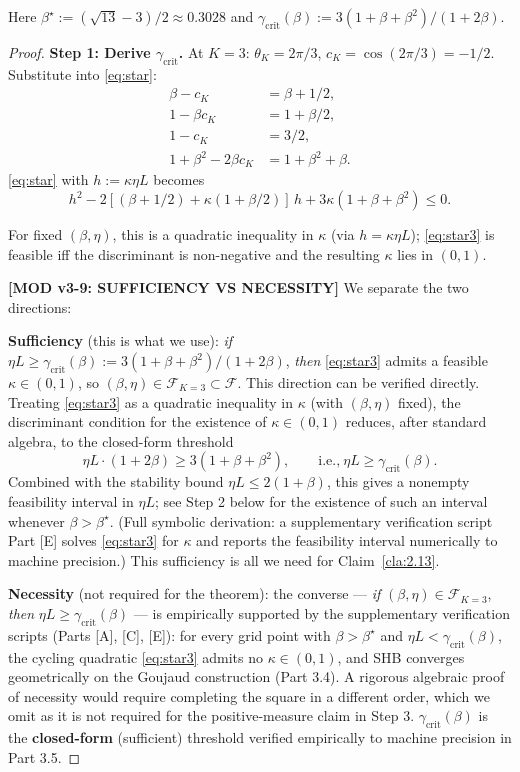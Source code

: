 \documentclass[11pt,a4paper]{article}
\theoremstyle{plain}
\theoremstyle{definition}
\theoremstyle{remark}
\newcommand{\F}{\mathcal{F}}
\begin{document}
Here $\beta^\star := (\sqrt{13} - 3)/2 \approx 0.3028$ and $\gamma_\mathrm{crit}(\beta) := 3(1+\beta+\beta^2)/(1 + 2\beta)$.

\begin{proof}
\textbf{Step 1: Derive $\gamma_\mathrm{crit}$.} At $K = 3$: $\theta_K = 2\pi/3$, $c_K = \cos(2\pi/3) = -1/2$. Substitute into \eqref{eq:star}:
\begin{align*}
\beta - c_K &= \beta + 1/2,\\
1 - \beta c_K &= 1 + \beta/2,\\
1 - c_K &= 3/2,\\
1 + \beta^2 - 2\beta c_K &= 1 + \beta^2 + \beta.
\end{align*}
\eqref{eq:star} with $h := \kappa \eta L$ becomes
\begin{equation}
h^2 - 2[(\beta + 1/2) + \kappa(1 + \beta/2)]\, h + 3\kappa(1 + \beta + \beta^2) \leq 0. \tag{$\star_3$}\label{eq:star3}
\end{equation}

For fixed $(\beta, \eta)$, this is a quadratic inequality in $\kappa$ (via $h = \kappa\eta L$); \eqref{eq:star3} is feasible iff the discriminant is non-negative and the resulting $\kappa$ lies in $(0,1)$.

\textbf{[MOD v3-9: SUFFICIENCY VS NECESSITY]} We separate the two directions:

\textbf{Sufficiency} (this is what we use): \emph{if} $\eta L \geq \gamma_\mathrm{crit}(\beta) := 3(1+\beta+\beta^2)/(1 + 2\beta)$, \emph{then} \eqref{eq:star3} admits a feasible $\kappa \in (0,1)$, so $(\beta,\eta) \in \F_{K=3} \subset \F$. This direction can be verified directly. Treating \eqref{eq:star3} as a quadratic inequality in $\kappa$ (with $(\beta, \eta)$ fixed), the discriminant condition for the existence of $\kappa \in (0,1)$ reduces, after standard algebra, to the closed-form threshold
\[
\eta L \cdot (1 + 2\beta) \geq 3(1 + \beta + \beta^2),\qquad \text{i.e.,}\ \eta L \geq \gamma_\mathrm{crit}(\beta).
\]
Combined with the stability bound $\eta L \leq 2(1+\beta)$, this gives a nonempty feasibility interval in $\eta L$; see Step 2 below for the existence of such an interval whenever $\beta > \beta^\star$. (Full symbolic derivation: a supplementary verification script Part [E] solves \eqref{eq:star3} for $\kappa$ and reports the feasibility interval numerically to machine precision.) This sufficiency is all we need for Claim~\ref{cla:2.13}.

\textbf{Necessity} (not required for the theorem): the converse --- \emph{if} $(\beta,\eta) \in \F_{K=3}$, \emph{then} $\eta L \geq \gamma_\mathrm{crit}(\beta)$ --- is empirically supported by the supplementary verification scripts (Parts [A], [C], [E]): for every grid point with $\beta > \beta^\star$ and $\eta L < \gamma_\mathrm{crit}(\beta)$, the cycling quadratic \eqref{eq:star3} admits no $\kappa \in (0,1)$, and SHB converges geometrically on the Goujaud construction (Part 3.4). A rigorous algebraic proof of necessity would require completing the square in a different order, which we omit as it is not required for the positive-measure claim in Step 3. $\gamma_\mathrm{crit}(\beta)$ is the \textbf{closed-form} (sufficient) threshold verified empirically to machine precision in Part 3.5.


\end{proof}
\end{document}
